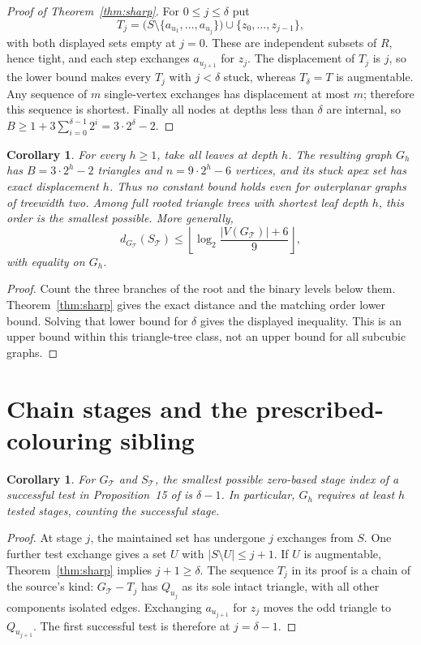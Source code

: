 \documentclass[11pt]{article}
\newtheorem{corollary}[theorem]{Corollary}
\begin{document}
\begin{proof}[Proof of Theorem~\ref{thm:sharp}]
For $0\leq j\leq\delta$ put
\[
 T_j=\bigl(S\setminus\{a_{u_1},\ldots,a_{u_j}\}\bigr)
          \cup\{z_0,\ldots,z_{j-1}\},
\]
with both displayed sets empty at $j=0$. These are independent subsets
of $R$, hence tight, and each step exchanges $a_{u_{j+1}}$ for $z_j$.
The displacement of $T_j$ is $j$, so the lower bound makes every
$T_j$ with $j<\delta$ stuck, whereas $T_\delta=T$ is augmentable.
Any sequence of $m$ single-vertex exchanges has displacement at most $m$;
therefore this sequence is shortest. Finally all nodes at depths less
than $\delta$ are internal, so
$B\geq1+3\sum_{i=0}^{\delta-1}2^i=3\cdot2^\delta-2$.
\end{proof}

\begin{corollary}\label{cor:uniform}
For every $h\geq1$, take all leaves at depth $h$. The resulting graph
$G_h$ has $B=3\cdot2^h-2$ triangles and $n=9\cdot2^h-6$ vertices,
and its stuck apex set has exact displacement $h$. Thus no constant
bound holds even for outerplanar graphs of treewidth two.
Among full rooted triangle trees with shortest leaf depth $h$, this
order is the smallest possible. More generally,
\[
 d_{G_{\mathcal T}}(S_{\mathcal T})
 \leq\left\lfloor\log_2\frac{|V(G_{\mathcal T})|+6}{9}\right\rfloor,
\]
with equality on $G_h$.
\end{corollary}
\begin{proof}
Count the three branches of the root and the binary levels below them.
Theorem~\ref{thm:sharp} gives the exact distance and the matching
order lower bound. Solving that lower bound for $\delta$ gives the
displayed inequality. This is an upper bound within this triangle-tree
class, not an upper bound for all subcubic graphs.
\end{proof}

\section{Chain stages and the prescribed-colouring sibling}

\begin{corollary}\label{cor:stages}
For $G_{\mathcal T}$ and $S_{\mathcal T}$, the smallest possible
zero-based stage index of a successful test in Proposition~15 of
\cite{CYKKW} is $\delta-1$. In particular, $G_h$ requires at least
$h$ tested stages, counting the successful stage.
\end{corollary}
\begin{proof}
At stage $j$, the maintained set has undergone $j$ exchanges from $S$.
One further test exchange gives a set $U$ with
$|S\setminus U|\leq j+1$. If $U$ is augmentable,
Theorem~\ref{thm:sharp} implies $j+1\geq\delta$.
The sequence $T_j$ in its proof is a chain of the source's kind:
$G_{\mathcal T}-T_j$ has $Q_{u_j}$ as its sole intact triangle,
with all other components isolated edges. Exchanging
$a_{u_{j+1}}$ for $z_j$ moves the odd triangle to $Q_{u_{j+1}}$.
The first successful test is therefore at $j=\delta-1$.
\end{proof}
\end{document}
